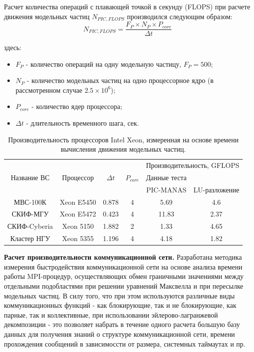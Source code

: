 Расчет количества операций с плавающей точкой в секунду (FLOPS) при расчете движения модельных частиц $N_{PIC,FLOPS}$ производился следующим образом:
\begin{equation}
N_{PIC,FLOPS} = \frac{F_P\times N_P \times P_{core}}{\Delta t}
\label{PIC_FLOPS}
\end{equation}

здесь:
\begin{itemize}
	\item $F_P$ - количество операций на одну модельную частицу, $F_P = 500$;
	\item $N_P$ - количество модельных частиц на одно процессорное ядро (в рассмотренном случае $2.5\times 10^6$);  
	\item $P_{core}$ - количество ядер процессора;
	\item $\Delta t$  - длительность временного шага, сек.
\end{itemize}	

\begin{table}[ht]
	\caption{Производительность процессоров Intel Xeon, измеренная на основе времени вычисления движения модельных частиц.}
	\label{PIC_vs_PROC_RAM}
	\begin{tabular}{|c|c|c|c|c|c|}
		\hline
		&            &            &             &       \multicolumn{2}{|c|}{Производительность, GFLOPS} \\ \cline{5-6}  	
		Название ВС  & Процессор  &  $\Delta t$ &$P_{core}$ & Данные теста  &  \\
		&            &             &           & PIC-MANAS     & LU-разложение \\ \hline
		МВС-100К     & Xeon E5450 &  0.878      & 4     & 5.69           & 4.6     \\ \hline 
		СКИФ-МГУ     & Xeon E5472 &  0.423      & 4     & 11.83          & 2.37       \\ \hline     
		СКИФ-Cyberia & Xeon 5150  &  1.882      & 2     &  1.33          & 4.65    \\ \hline
		Кластер НГУ  & Xeon 5355  &  1.196      & 4     & 4.18           & 1.82       \\ \hline
	\end{tabular}	
\end{table}

 

\clearpage

\textbf{Расчет производительности коммуникационной сети.}
Разработана методика измерения быстродействия коммуникационной сети на основе анализа времени работы MPI-процедур, осуществляющих обмен граничными значениями между отдельными подобластями при решении уравнений Максвелла и при пересылке модельных частиц. В силу того, что при этом используются различные виды коммуникационных функций  - как блокирующие, так и не блокирующие, как парные, так и коллективные, при использовании эйлерово-лагранжевой декомпозиции - это позволяет набрать в течение одного расчета большую базу данных для получения знаний о структуре коммуникационной сети, времени прохождения сообщений в зависимоссти от размера, системных таймаутах и пр. 

